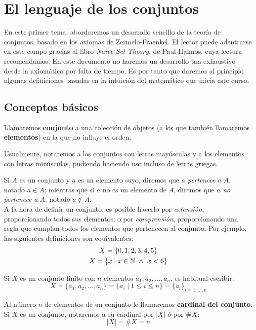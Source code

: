 \chapter{El lenguaje de los conjuntos}
En este primer tema, abordaremos un desarrollo sencillo de la teoría de conjuntos, basado en los axiomas de Zermelo-Fraenkel. El lector puede adentrarse en este campo gracias al libro \emph{Naive Set Theory}, de Paul Halmos, cuya lectura recomendamos. En este documento no haremos un desarrollo tan exhaustivo desde la axiomática por falta de tiempo. Es por tanto que daremos al principio algunas definiciones basadas en la intuición del matemático que inicia este curso.

\section{Conceptos básicos}

\begin{definicion}[Conjunto]
    Llamaremos \textbf{conjunto} a una colección de objetos (a los que también llamaremos \textbf{elementos})
    en la que no influye el orden.
\end{definicion}
\begin{notacion}
    Usualmente, notaremos a los conjuntos con letras mayúsculas y a los elementos con letras minúsculas, pudiendo haciendo uso incluso de letras griegas.
\end{notacion}

Si $A$ es un conjunto y $a$ es un elemento suyo, diremos que \textit{$a$ pertenece a $A$}, notado $a \in A$; mientras que si $a$ no es un elemento de $A$, diremos que \textit{$a$ no pertenece a $A$}, notado $a \notin A$.\\

A la hora de definir un conjunto, es posible hacerlo por \textit{extensión}, proporcionando todos sus elementos; o por \textit{comprensión}, proporcionando una regla que cumplan todos los elementos que pertenecen al conjunto. Por ejemplo, las siguientes definiciones son equivalentes:
\begin{gather*}
    X = \{0, 1, 2, 3, 4, 5\} \\
    X = \{x \mid x \in \mathbb N \ \land \  x < 6\}
\end{gather*}

Si $X$ es un conjunto finito con $n$ elementos $a_1, a_2, \ldots, a_n$, es habitual escribir: $$X = \{a_1, a_2, \ldots, a_n\} = \{a_i \mid 1 \leq i \leq n\} = \{a_i\}_{i = 1, \ldots, n}$$

\begin{definicion}[Cardinal]
    Al número $n$ de elementos de un conjunto le llamaremos \textbf{cardinal del conjunto}. Si $X$
    es un conjunto, notaremos a su cardinal por $|X|$ ó por $\#X$:
    $$|X| = \#X = n$$
\end{definicion}

